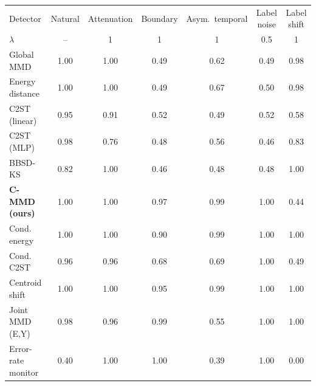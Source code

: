 \setlength{\tabcolsep}{2.5pt}\renewcommand{\arraystretch}{1.1}%
\begin{tabular}{lcccccc}
\toprule
Detector & Natural & Attenuation & Boundary & Asym.\ temporal & Label noise & Label shift \\
$\lambda$ & -- & 1 & 1 & 1 & 0.5 & 1 \\
\midrule
Global MMD & 1.00 & 1.00 & 0.49 & 0.62 & 0.49 & 0.98 \\
Energy distance & 1.00 & 1.00 & 0.49 & 0.67 & 0.50 & 0.98 \\
C2ST (linear) & 0.95 & 0.91 & 0.52 & 0.49 & 0.52 & 0.58 \\
C2ST (MLP) & 0.98 & 0.76 & 0.48 & 0.56 & 0.46 & 0.83 \\
BBSD-KS & 0.82 & 1.00 & 0.46 & 0.48 & 0.48 & 1.00 \\
\textbf{C-MMD (ours)} & 1.00 & 1.00 & 0.97 & 0.99 & 1.00 & 0.44 \\
Cond. energy & 1.00 & 1.00 & 0.90 & 0.99 & 1.00 & 1.00 \\
Cond. C2ST & 0.96 & 0.96 & 0.68 & 0.69 & 1.00 & 0.49 \\
Centroid shift & 1.00 & 1.00 & 0.95 & 0.99 & 1.00 & 1.00 \\
Joint MMD (E,Y) & 0.98 & 0.96 & 0.99 & 0.55 & 1.00 & 1.00 \\
Error-rate monitor & 0.40 & 1.00 & 1.00 & 0.39 & 1.00 & 0.00 \\
\bottomrule
\end{tabular}